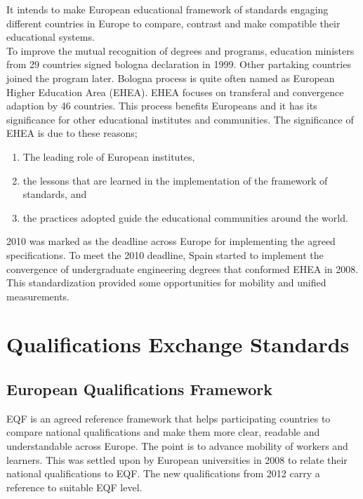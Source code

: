 \documentclass[12pt,a4paper,oneside]{book}
\begin{document}
It intends to make European educational framework of standards engaging different countries in Europe to compare, contrast and make compatible their educational systems. \cite{bologna process} \\

To improve the mutual recognition of degrees and programs, education ministers from 29 countries signed bologna declaration in 1999. Other partaking countries joined the program later. \cite{improvement bologna process} Bologna process is quite often named as European Higher Education Area (EHEA). EHEA focuses on transferal and convergence adaption by 46 countries. This process benefits Europeans and it has its significance for other educational institutes and communities. The significance of EHEA is due to these reasons;

	\begin{enumerate}

		\item The leading role of European institutes,

		\item the lessons that are learned in the implementation of the framework of standards, and
	
		\item the practices adopted guide the educational communities around the world.

	\end{enumerate} 

	2010 was marked as the deadline across Europe for implementing the agreed specifications. \cite{EHEA} To meet the 2010 deadline, Spain started to implement the convergence of undergraduate engineering degrees that conformed EHEA in 2008. This standardization provided some opportunities for mobility and unified measurements. \cite{EHEA}

\section{Qualifications Exchange Standards}

    \subsection{European Qualifications Framework}
    EQF is an agreed reference framework that helps participating countries to compare national qualifications and make them more clear, readable and understandable across Europe. The point is to advance mobility of workers and learners. This was settled upon by European universities in 2008 to relate their national qualifications to EQF. The new qualifications from 2012 carry a reference to suitable EQF level. \\
\end{document}
